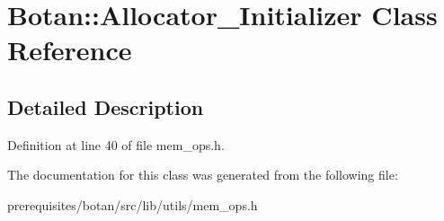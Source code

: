 \hypertarget{class_botan_1_1_allocator___initializer}{}\section{Botan\+:\+:Allocator\+\_\+\+Initializer Class Reference}
\label{class_botan_1_1_allocator___initializer}


\subsection{Detailed Description}


Definition at line 40 of file mem\+\_\+ops.\+h.



The documentation for this class was generated from the following file\+:\begin{DoxyCompactItemize}
\item 
prerequisites/botan/src/lib/utils/mem\+\_\+ops.\+h\end{DoxyCompactItemize}
